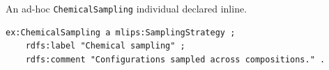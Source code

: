 An ad-hoc \texttt{ChemicalSampling} individual declared inline.
\begin{lstlisting}[language=turtle]
ex:ChemicalSampling a mlips:SamplingStrategy ;
    rdfs:label "Chemical sampling" ;
    rdfs:comment "Configurations sampled across compositions." .
\end{lstlisting}
